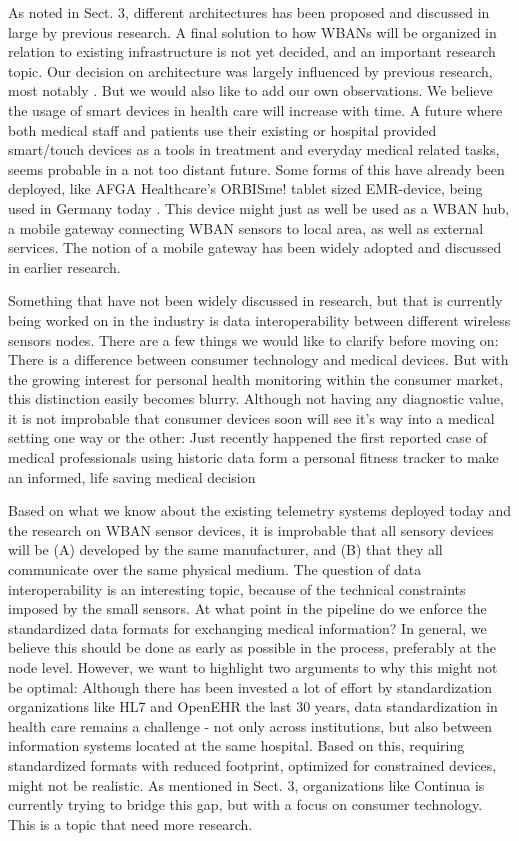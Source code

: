 As noted in Sect. 3, different architectures has been proposed and discussed in large by previous research. A final solution to how WBANs will be organized in relation to existing infrastructure is not yet decided, and an important research topic. Our decision on architecture was largely influenced by previous research, most notably \cite{Shahamabadi:2013df}. But we would also like to add our own observations. We believe the usage of smart devices in health care will increase with time. A future where both medical staff and patients use their existing or hospital provided smart/touch devices as a tools in treatment and everyday medical related tasks, seems probable in a not too distant future. Some forms of this have already been deployed, like AFGA Healthcare's ORBISme! tablet sized EMR-device, being used in Germany today \cite{newRef_27}. This device might just as well be used as a WBAN hub, a mobile gateway connecting WBAN sensors to local area, as well as external services. The notion of a mobile gateway has been widely adopted and discussed \cite{Movassaghi:2014hi, Mohammed:2014dw, Touati:2015gy, EmilJovanov:2005ty} in earlier research.

Something that have not been widely discussed in research, but that is currently being worked on in the industry is data interoperability between different wireless sensors nodes. There are a few things we would like to clarify before moving on: There is a difference between consumer technology and medical devices. But with the growing interest for personal health monitoring within the consumer market, this distinction easily becomes blurry. Although not having any diagnostic value, it is not improbable that consumer devices soon will see it's way into a medical setting one way or the other: Just recently happened the first reported case of medical professionals using historic data form a personal fitness tracker to make an informed, life saving medical decision \cite{newRef_29}

Based on what we know about the existing telemetry systems deployed today and the research on WBAN sensor devices, it is improbable that all sensory devices will be (A) developed by the same manufacturer, and (B) that they all communicate over the same physical medium. The question of data interoperability is an interesting topic, because of the technical constraints imposed by the small sensors. At what point in the pipeline do we enforce the standardized data formats for exchanging medical information? In general, we believe this should be done as early as possible in the process, preferably at the node level. However, we want to highlight two arguments to why this might not be optimal: Although there has been invested a lot of effort by standardization organizations like HL7 and OpenEHR the last 30 years, data standardization in health care remains a challenge - not only across institutions, but also between information systems located at the same hospital. Based on this, requiring standardized formats with reduced footprint, optimized for constrained devices, might not be realistic. As mentioned in Sect. 3, organizations like Continua is currently trying to bridge this gap, but with a focus  on consumer technology. This is a topic that need more research.


